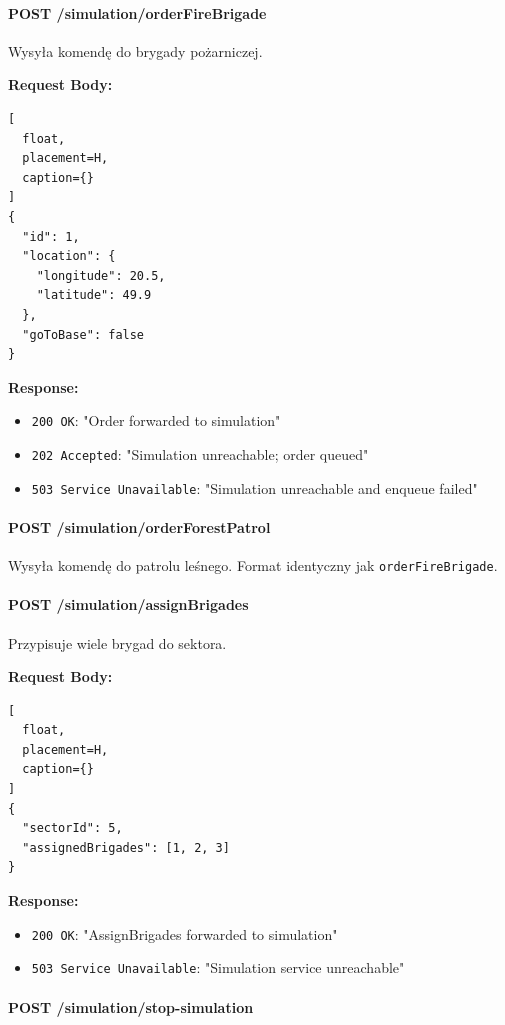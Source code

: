 \paragraph{POST /simulation/orderFireBrigade}

Wysyła komendę do brygady pożarniczej.

\textbf{Request Body:}
\begin{lstlisting}[
  float,
  placement=H,
  caption={}
]
{
  "id": 1,
  "location": {
    "longitude": 20.5,
    "latitude": 49.9
  },
  "goToBase": false
}
\end{lstlisting}

\textbf{Response:}
\begin{itemize}
    \item \texttt{200 OK}: "Order forwarded to simulation"
    \item \texttt{202 Accepted}: "Simulation unreachable; order queued"
    \item \texttt{503 Service Unavailable}: "Simulation unreachable and enqueue failed"
\end{itemize}

\paragraph{POST /simulation/orderForestPatrol}

Wysyła komendę do patrolu leśnego. Format identyczny jak \texttt{orderFireBrigade}.

\paragraph{POST /simulation/assignBrigades}

Przypisuje wiele brygad do sektora.

\textbf{Request Body:}
\begin{lstlisting}[
  float,
  placement=H,
  caption={}
]
{
  "sectorId": 5,
  "assignedBrigades": [1, 2, 3]
}
\end{lstlisting}

\textbf{Response:}
\begin{itemize}
    \item \texttt{200 OK}: "AssignBrigades forwarded to simulation"
    \item \texttt{503 Service Unavailable}: "Simulation service unreachable"
\end{itemize}

\paragraph{POST /simulation/stop-simulation}


